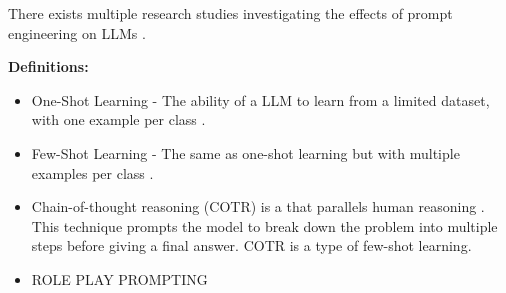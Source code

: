 There exists multiple research studies investigating the effects of prompt engineering on LLMs \cite{van_zandvoort_enhancing_2023, lee_cxr-llava_2023, chen_unleashing_2023}. 

\textbf{Definitions: }
\begin{itemize}
    \item One-Shot Learning - The ability of a LLM to learn from a limited dataset, with one example per class \cite{o_mahony_one-shot_2019}.
    \item Few-Shot Learning - The same as one-shot learning but with multiple examples per class \cite{parnami_learning_2022}.
    \item Chain-of-thought reasoning (COTR) is a that parallels human reasoning \cite{wei_chain--thought_2022}. This technique prompts the model to break down the problem into multiple steps before giving a final answer. COTR is a type of few-shot learning.
    \item ROLE PLAY PROMPTING

\end{itemize}




